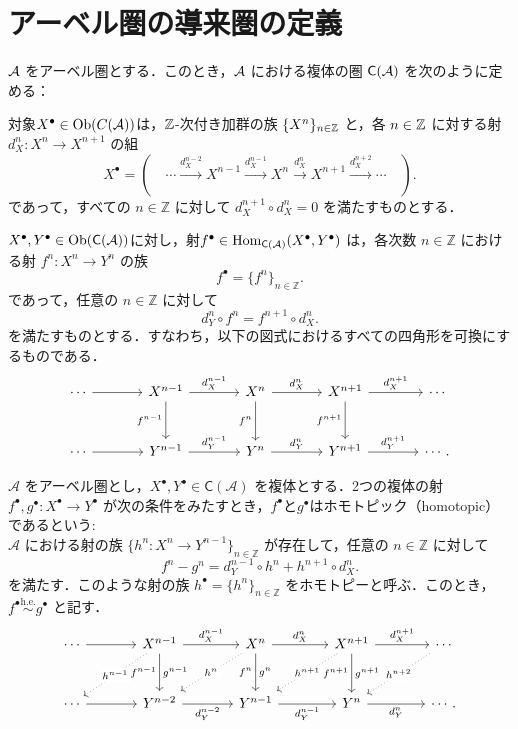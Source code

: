 \section{アーベル圏の導来圏の定義}

\begin{defn}\cite[p.300]{KS06}
${\mathcal A}$ をアーベル圏とする．このとき，${\mathcal A}$ における複体の圏 $\mathsf{C}({\mathcal A})$ を次のように定める：

対象$X^\bullet\in\mathrm{Ob}(C({\mathcal A}))$は，${\mathbb Z}$-次付き加群の族 $\{X^n\}_{n \in {\mathbb Z}}$ と，各 $n \in {\mathbb Z}$ に対する射 $d_{X}^n: X^n \to X^{n+1}$ の組
  \[
		X^\bullet = ( \quad \cdots \xrightarrow{d_{X}^{n-2}} X^{n-1} \xrightarrow{d_{X}^{n-1}} X^n \xrightarrow{d_{X}^n} X^{n+1} \xrightarrow{d_{X}^{n+2}} \cdots \quad ).
  \]
	であって，すべての $n \in \mathbb{Z}$ に対して $d_{X}^{n+1} \circ d_{X}^n = 0$ を満たすものとする．

	$X^\bullet , Y^\bullet\in\mathrm{Ob}(\mathsf{C}({\mathcal A}))$に対し，射$f^\bullet\in \operatorname{\mathrm{Hom}}_{\mathsf{C}({\mathcal A})}(X^\bullet,Y^\bullet)$ は，各次数 $n \in \mathbb{Z}$ における射 $f^n: X^n \to Y^n$ の族
  \[
    f^\bullet = \{f^n\}_{n \in \mathbb{Z}}.
  \]
  であって，任意の $n \in \mathbb{Z}$ に対して
  \[
    d_Y^n \circ f^n = f^{n+1} \circ d_X^n.
  \]
  を満たすものとする．すなわち，以下の図式におけるすべての四角形を可換にするものである．
		\[
\begin{tikzcd}[column sep=large, row sep=large]
  \cdots \ar[r] &
  X^{n-1} \ar[r,"d_X^{n-1}"] \ar[d,"f^{n-1}"'] &
  X^n \ar[r,"d_X^n"] \ar[d,"f^n"'] &
  X^{n+1} \ar[r,"d_X^{n+1}"] \ar[d,"f^{n+1}"'] &
  \cdots \\
  \cdots \ar[r] &
  Y^{n-1} \ar[r,"d_Y^{n-1}"] &
  Y^n \ar[r,"d_Y^n"] &
  Y^{n+1} \ar[r,"d_Y^{n+1}"] &
	\cdots .
\end{tikzcd}
	\]
\end{defn}

\begin{defn}\cite[p.272]{KS06}
	$\mathcal{A}$ をアーベル圏とし，$X^\bullet, Y^\bullet \in \mathsf{C}(\mathcal{A})$ を複体とする．2つの複体の射 $f^\bullet, g^\bullet: X^\bullet \to Y^\bullet$ が次の条件をみたすとき，$f^\bullet$と$g^\bullet$はホモトピック（homotopic）であるという:\\
	$\mathcal{A}$ における射の族 $\{h^n: X^n \to Y^{n-1}\}_{n \in \mathbb{Z}}$ が存在して，任意の $n \in \mathbb{Z}$ に対して
\[
  f^n - g^n = d_Y^{n-1} \circ h^n + h^{n+1} \circ d_X^n.
\]
を満たす．このような射の族 $h^\bullet = \{h^n\}_{n \in \mathbb{Z}}$ をホモトピーと呼ぶ．このとき，$f^\bullet \overset{\mathrm{h.e.}}{\sim} g^\bullet$ と記す．
\[\begin{tikzcd}[column sep=large, row sep=large]
  \cdots \ar[r] &
	X^{n-1} \ar[r,"d_X^{n-1}"] \ar[d,"f^{n-1}"',"g^{n-1}"] \ar[dl,dotted,"h^{n-1}"description] &
  X^n \ar[r,"d_X^n"] \ar[d,"f^n"',"g^n"] \ar[dl,dotted,"h^n"description] &
	X^{n+1} \ar[r,"d_X^{n+1}"] \ar[d,"f^{n+1}"',"g^{n+1}"] \ar[dl,dotted,"h^{n+1}"description] &
	\cdots\ar[dl,dotted,"h^{n+2}"description] \\
  \cdots \ar[r] &
  Y^{n-2} \ar[r,"d_Y^{n-2}"'] &
  Y^{n-1} \ar[r,"d_Y^{n-1}"'] &
  Y^n \ar[r,"d_Y^n"'] &
  \cdots .
\end{tikzcd}
\]

\end{defn}

